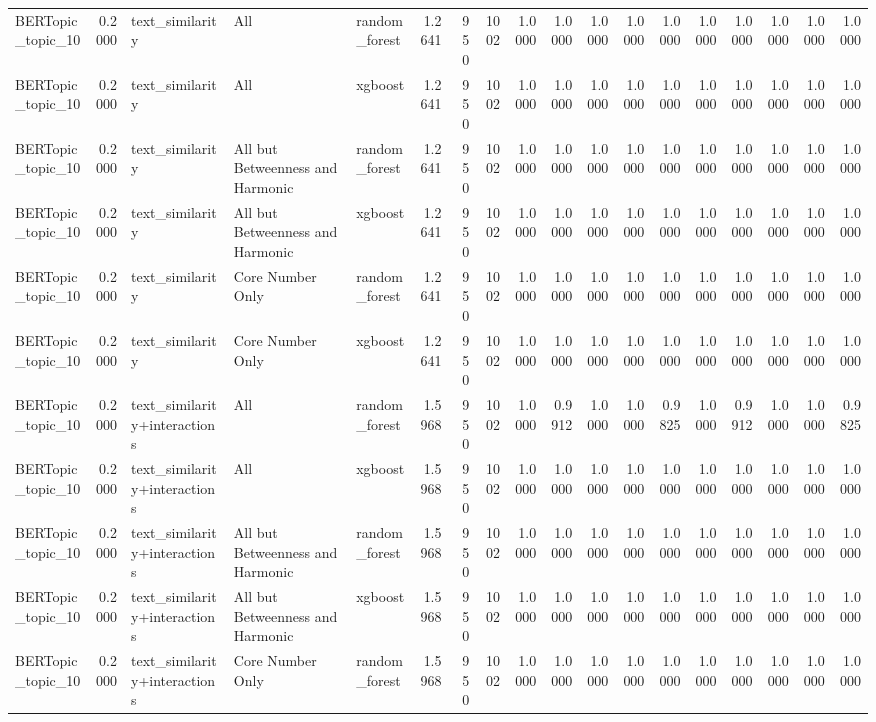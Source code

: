 \begin{tabular}{lrlllrrrrrrrrrrrrr}
BERTopic_topic_10 & 0.2000 & text_similarity & All & random_forest & 1.2641 & 950 & 1002 & 1.0000 & 1.0000 & 1.0000 & 1.0000 & 1.0000 & 1.0000 & 1.0000 & 1.0000 & 1.0000 & 1.0000 \\
BERTopic_topic_10 & 0.2000 & text_similarity & All & xgboost & 1.2641 & 950 & 1002 & 1.0000 & 1.0000 & 1.0000 & 1.0000 & 1.0000 & 1.0000 & 1.0000 & 1.0000 & 1.0000 & 1.0000 \\
BERTopic_topic_10 & 0.2000 & text_similarity & All but Betweenness and Harmonic & random_forest & 1.2641 & 950 & 1002 & 1.0000 & 1.0000 & 1.0000 & 1.0000 & 1.0000 & 1.0000 & 1.0000 & 1.0000 & 1.0000 & 1.0000 \\
BERTopic_topic_10 & 0.2000 & text_similarity & All but Betweenness and Harmonic & xgboost & 1.2641 & 950 & 1002 & 1.0000 & 1.0000 & 1.0000 & 1.0000 & 1.0000 & 1.0000 & 1.0000 & 1.0000 & 1.0000 & 1.0000 \\
BERTopic_topic_10 & 0.2000 & text_similarity & Core Number Only & random_forest & 1.2641 & 950 & 1002 & 1.0000 & 1.0000 & 1.0000 & 1.0000 & 1.0000 & 1.0000 & 1.0000 & 1.0000 & 1.0000 & 1.0000 \\
BERTopic_topic_10 & 0.2000 & text_similarity & Core Number Only & xgboost & 1.2641 & 950 & 1002 & 1.0000 & 1.0000 & 1.0000 & 1.0000 & 1.0000 & 1.0000 & 1.0000 & 1.0000 & 1.0000 & 1.0000 \\
BERTopic_topic_10 & 0.2000 & text_similarity+interactions & All & random_forest & 1.5968 & 950 & 1002 & 1.0000 & 0.9912 & 1.0000 & 1.0000 & 0.9825 & 1.0000 & 0.9912 & 1.0000 & 1.0000 & 0.9825 \\
BERTopic_topic_10 & 0.2000 & text_similarity+interactions & All & xgboost & 1.5968 & 950 & 1002 & 1.0000 & 1.0000 & 1.0000 & 1.0000 & 1.0000 & 1.0000 & 1.0000 & 1.0000 & 1.0000 & 1.0000 \\
BERTopic_topic_10 & 0.2000 & text_similarity+interactions & All but Betweenness and Harmonic & random_forest & 1.5968 & 950 & 1002 & 1.0000 & 1.0000 & 1.0000 & 1.0000 & 1.0000 & 1.0000 & 1.0000 & 1.0000 & 1.0000 & 1.0000 \\
BERTopic_topic_10 & 0.2000 & text_similarity+interactions & All but Betweenness and Harmonic & xgboost & 1.5968 & 950 & 1002 & 1.0000 & 1.0000 & 1.0000 & 1.0000 & 1.0000 & 1.0000 & 1.0000 & 1.0000 & 1.0000 & 1.0000 \\
BERTopic_topic_10 & 0.2000 & text_similarity+interactions & Core Number Only & random_forest & 1.5968 & 950 & 1002 & 1.0000 & 1.0000 & 1.0000 & 1.0000 & 1.0000 & 1.0000 & 1.0000 & 1.0000 & 1.0000 & 1.0000 \\

\end{tabular}
